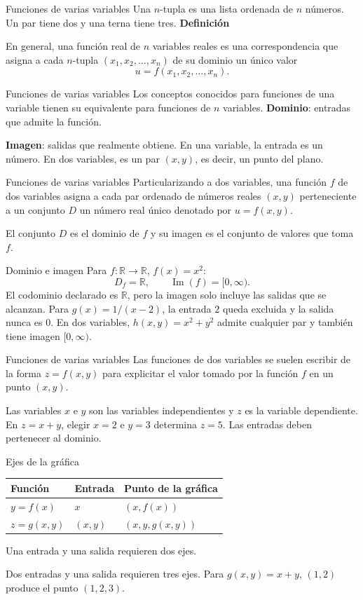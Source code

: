 \begin{frame}{Funciones de varias variables}
Una $n$-tupla es una lista ordenada de $n$ números. Un par tiene dos y una terna tiene tres.
\medskip
\textbf{Definición}
\medskip

En general, una función real de $n$ variables reales es una correspondencia que asigna a cada $n$-tupla $(x_1,x_2,\ldots,x_n)$ de su dominio un único valor
\[u=f(x_1,x_2,\ldots,x_n).\]
\end{frame}
\begin{frame}{Funciones de varias variables}
Los conceptos conocidos para funciones de una variable tienen su equivalente para funciones de $n$ variables.
\medskip
\textbf{Dominio}: entradas que admite la función.

\textbf{Imagen}: salidas que realmente obtiene.
\medskip
En una variable, la entrada es un número. En dos variables, es un par $(x,y)$, es decir, un punto del plano.
\end{frame}
\begin{frame}{Funciones de varias variables}
Particularizando a dos variables, una función $f$ de dos variables asigna a cada par ordenado de números reales $(x,y)$ perteneciente a un conjunto $D$ un número real único denotado por $u=f(x,y)$.
\medskip

El conjunto $D$ es el dominio de $f$ y su imagen es el conjunto de valores que toma $f$.
\end{frame}
\begin{frame}{Dominio e imagen}
Para $f:\mathbb R\to\mathbb R$, $f(x)=x^2$:
\[D_f=\mathbb R,\qquad \operatorname{Im}(f)=[0,\infty).\]
El codominio declarado es $\mathbb R$, pero la imagen solo incluye las salidas que se alcanzan.
\medskip
Para $g(x)=1/(x-2)$, la entrada $2$ queda excluida y la salida nunca es $0$.
\medskip
En dos variables, $h(x,y)=x^2+y^2$ admite cualquier par y también tiene imagen $[0,\infty)$.
\end{frame}
\begin{frame}{Funciones de varias variables}
Las funciones de dos variables se suelen escribir de la forma $z=f(x,y)$ para explicitar el valor tomado por la función $f$ en un punto $(x,y)$.
\medskip

Las variables $x$ e $y$ son las variables independientes y $z$ es la variable dependiente.
\medskip
En $z=x+y$, elegir $x=2$ e $y=3$ determina $z=5$. Las entradas deben pertenecer al dominio.
\end{frame}
\begin{frame}{Ejes de la gráfica}
\begin{center}\begin{tabular}{lll}
Función & Entrada & Punto de la gráfica\\\hline
$y=f(x)$ & $x$ & $(x,f(x))$\\[3mm]
$z=g(x,y)$ & $(x,y)$ & $(x,y,g(x,y))$
\end{tabular}\end{center}
Una entrada y una salida requieren dos ejes.

Dos entradas y una salida requieren tres ejes.
\medskip
Para $g(x,y)=x+y$, $(1,2)$ produce el punto $(1,2,3)$.
\end{frame}
